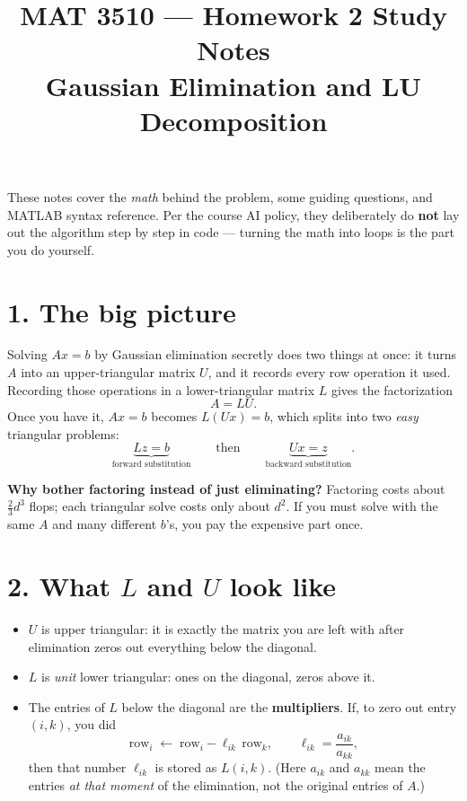 \documentclass[11pt]{article}
\title{MAT 3510 --- Homework 2 Study Notes\\
\large Gaussian Elimination and LU Decomposition}
\author{}
\date{}
\begin{document}
\maketitle

These notes cover the \emph{math} behind the problem, some guiding
questions, and MATLAB syntax reference. Per the course AI policy, they
deliberately do \textbf{not} lay out the algorithm step by step in code
--- turning the math into loops is the part you do yourself.

\section*{1. The big picture}

Solving $Ax=b$ by Gaussian elimination secretly does two things at once:
it turns $A$ into an upper-triangular matrix $U$, and it records every
row operation it used. Recording those operations in a lower-triangular
matrix $L$ gives the factorization
\[
  A = LU .
\]
Once you have it, $Ax=b$ becomes $L(Ux)=b$, which splits into two
\emph{easy} triangular problems:
\[
  \underbrace{Lz = b}_{\text{forward substitution}}
  \qquad\text{then}\qquad
  \underbrace{Ux = z}_{\text{backward substitution}} .
\]

\textbf{Why bother factoring instead of just eliminating?} Factoring costs
about $\tfrac{2}{3}d^3$ flops; each triangular solve costs only about
$d^2$. If you must solve with the same $A$ and many different $b$'s, you
pay the expensive part once.

\section*{2. What $L$ and $U$ look like}

\begin{itemize}
  \item $U$ is upper triangular: it is exactly the matrix you are left
        with after elimination zeros out everything below the diagonal.
  \item $L$ is \emph{unit} lower triangular: ones on the diagonal, zeros
        above it.
  \item The entries of $L$ below the diagonal are the \textbf{multipliers}.
        If, to zero out entry $(i,k)$, you did
        \[
          \text{row}_i \;\leftarrow\; \text{row}_i - \ell_{ik}\,\text{row}_k,
          \qquad
          \ell_{ik} = \frac{a_{ik}}{a_{kk}},
        \]
        then that number $\ell_{ik}$ is stored as $L(i,k)$.
        (Here $a_{ik}$ and $a_{kk}$ mean the entries \emph{at that moment}
        of the elimination, not the original entries of $A$.)
\end{itemize}
\end{document}
